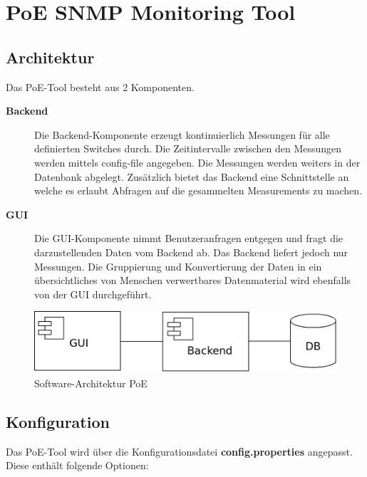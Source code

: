 \section{PoE SNMP Monitoring Tool}
\label{sec:tool}

\subsection{Architektur}

Das PoE-Tool besteht aus 2 Komponenten.

\begin{description}
  \item [\textbf{Backend}] Die Backend-Komponente erzeugt kontinuierlich
  Messungen für alle definierten Switches durch. Die Zeitintervalle zwischen den Messungen
  werden mittels config-file angegeben. Die Messungen werden weiters in der
  Datenbank abgelegt. Zusätzlich bietet das Backend eine Schnittstelle an welche
  es erlaubt Abfragen auf die gesammelten Measurements zu machen.
  \item [\textbf{GUI}] Die GUI-Komponente nimmt Benutzeranfragen entgegen und
  fragt die darzustellenden Daten vom Backend ab. Das Backend liefert jedoch nur
  Messungen. Die Gruppierung und Konvertierung der Daten in ein übersichtliches
  von Menschen verwertbares Datenmaterial wird ebenfalls von der GUI
  durchgeführt.  
\end{description}


\begin{figure}[h]
    \centering
    \leavevmode
    \includegraphics[width=1.0\linewidth]{figures/architecture.jpeg}
    \caption{Software-Architektur PoE}
    \label{fig:Software-Architektue PoE}
\end{figure}

\subsection{Konfiguration}

Das PoE-Tool wird über die Konfigurationsdatei
\textbf{config.properties} angepasst. Diese enthält folgende Optionen:

